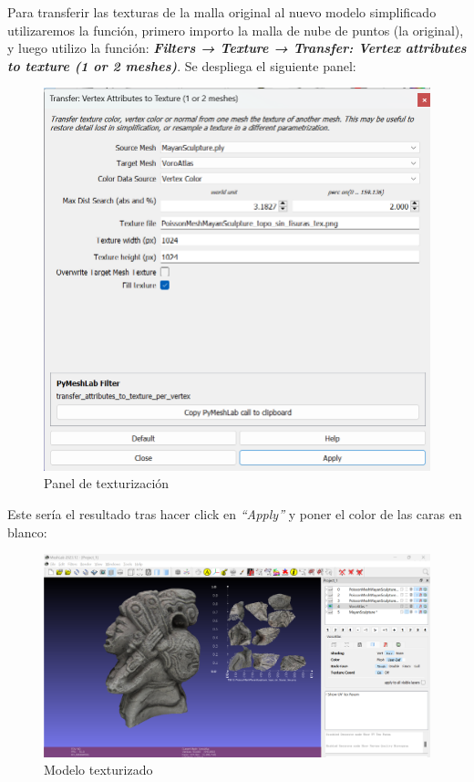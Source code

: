 \documentclass[options]{article}
\begin{document}
Para transferir las texturas de la malla original al nuevo modelo simplificado utilizaremos la función, primero importo la malla de nube de puntos (la original), y luego utilizo la función: \textbf{\textit{Filters → Texture → Transfer: Vertex attributes to texture (1 or 2 meshes)}}. Se despliega el siguiente panel:

\begin{figure}[H]
    \centering
    \includegraphics[scale=0.65]{images/textura_02.png}
    \caption{Panel de texturización}
\end{figure}

Este sería el resultado tras hacer click en \textit{``Apply''} y poner el color de las caras en blanco:

\begin{figure}[H]
    \centering
    \includegraphics[scale=0.34]{images/textura_03.png}
    \caption{Modelo texturizado}
\end{figure}
\end{document}
